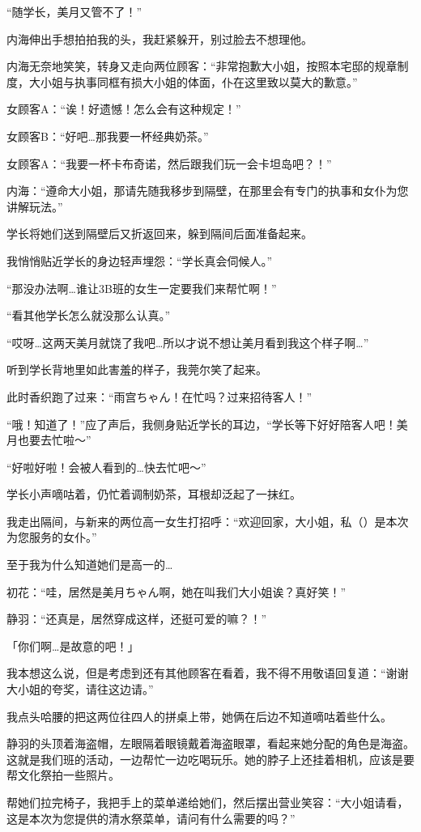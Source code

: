 “随学长，美月又管不了！”

内海伸出手想拍拍我的头，我赶紧躲开，别过脸去不想理他。

内海无奈地笑笑，转身又走向两位顾客：“非常抱歉大小姐，按照本宅邸的规章制度，大小姐与执事同框有损大小姐的体面，仆在这里致以莫大的歉意。”

女顾客A：“诶！好遗憾！怎么会有这种规定！”

女顾客B：“好吧…那我要一杯经典奶茶。”

女顾客A：“我要一杯卡布奇诺，然后跟我们玩一会卡坦岛吧？！”

内海：“遵命大小姐，那请先随我移步到隔壁，在那里会有专门的执事和女仆为您讲解玩法。”

学长将她们送到隔壁后又折返回来，躲到隔间后面准备起来。

我悄悄贴近学长的身边轻声埋怨：“学长真会伺候人。”

“那没办法啊…谁让3B班的女生一定要我们来帮忙啊！”

“看其他学长怎么就没那么认真。”

“哎呀…这两天美月就饶了我吧…所以才说不想让美月看到我这个样子啊…”

听到学长背地里如此害羞的样子，我莞尔笑了起来。

此时香织跑了过来：“雨宫ちゃん！在忙吗？过来招待客人！”

“哦！知道了！”应了声后，我侧身贴近学长的耳边，“学长等下好好陪客人吧！美月也要去忙啦～”

“好啦好啦！会被人看到的…快去忙吧～”

学长小声嘀咕着，仍忙着调制奶茶，耳根却泛起了一抹红。


我走出隔间，与新来的两位高一女生打招呼：“欢迎回家，大小姐，私（）是本次为您服务的女仆。”

至于我为什么知道她们是高一的…

初花：“哇，居然是美月ちゃん啊，她在叫我们大小姐诶？真好笑！\laughtear”

静羽：“还真是，居然穿成这样，还挺可爱的嘛？！”

「你们啊…是故意的吧！」

我本想这么说，但是考虑到还有其他顾客在看着，我不得不用敬语回复道：“谢谢大小姐的夸奖，请往这边请。”

我点头哈腰的把这两位往四人的拼桌上带，她俩在后边不知道嘀咕着些什么。

静羽的头顶着海盗帽，左眼隔着眼镜戴着海盗眼罩，看起来她分配的角色是海盗。这就是我们班的活动，一边帮忙一边吃喝玩乐。她的脖子上还挂着相机，应该是要帮文化祭拍一些照片。

帮她们拉完椅子，我把手上的菜单递给她们，然后摆出营业笑容：“大小姐请看，这是本次为您提供的清水祭菜单，请问有什么需要的吗？”

